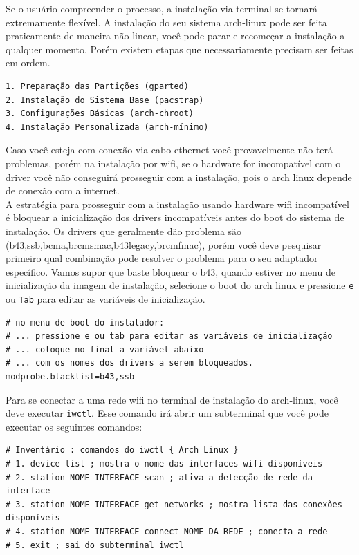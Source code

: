 \documentclass[12pt,a4paper]{article}
\begin{document}
Se o usuário compreender o processo, a instalação via terminal se tornará extremamente flexível. A instalação do seu sistema arch-linux pode ser feita praticamente de maneira não-linear, você pode parar e recomeçar a instalação a qualquer momento. Porém existem etapas que necessariamente precisam ser feitas em ordem.\\

\begin{lstlisting}
1. Preparação das Partições (gparted)
2. Instalação do Sistema Base (pacstrap)
3. Configurações Básicas (arch-chroot)
4. Instalação Personalizada (arch-mínimo)
\end{lstlisting}

\vspace{\baselineskip}

Caso você esteja com conexão via cabo ethernet você provavelmente não terá problemas, porém na instalação por wifi, se o hardware for incompatível com o driver você não conseguirá prosseguir com a instalação, pois o arch linux depende de conexão com a internet. \\

A estratégia para prosseguir com a instalação usando hardware wifi incompatível é bloquear a inicialização dos drivers incompatíveis antes do boot do sistema de instalação. Os drivers que geralmente dão problema são (b43,ssb,bcma,brcmsmac,b43legacy,brcmfmac), porém você deve pesquisar primeiro qual combinação pode resolver o problema para o seu adaptador específico. Vamos supor que baste bloquear o b43, quando estiver no menu de inicialização da imagem de instalação, selecione o boot do arch linux e pressione \texttt{e} ou \texttt{Tab} para editar as variáveis de inicialização.\\

\begin{lstlisting}
# no menu de boot do instalador:
# ... pressione e ou tab para editar as variáveis de inicialização 
# ... coloque no final a variável abaixo
# ... com os nomes dos drivers a serem bloqueados.
modprobe.blacklist=b43,ssb 
\end{lstlisting}

\vspace{\baselineskip}

Para se conectar a uma rede wifi no terminal de instalação do arch-linux, você deve executar \texttt{iwctl}. Esse comando irá abrir um subterminal que você pode executar os seguintes comandos: \\

\begin{lstlisting}
# Inventário : comandos do iwctl { Arch Linux }
# 1. device list ; mostra o nome das interfaces wifi disponíveis 
# 2. station NOME_INTERFACE scan ; ativa a detecção de rede da interface
# 3. station NOME_INTERFACE get-networks ; mostra lista das conexões disponíveis
# 4. station NOME_INTERFACE connect NOME_DA_REDE ; conecta a rede 
# 5. exit ; sai do subterminal iwctl
\end{lstlisting}
\end{document}
